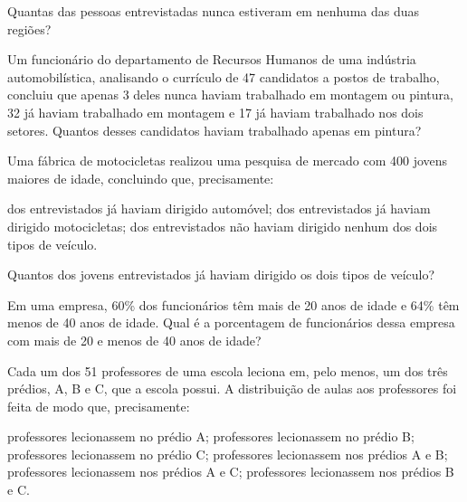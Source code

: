 \documentclass[10pt,a4paper]{article}
\begin{document}
\begin{multicols}{2}
\begin{question}[type=exam]
      Quantas das pessoas entrevistadas nunca estiveram em nenhuma das duas regiões?
    \end{question}

    \begin{question}[type=exam]
      Um funcionário do departamento de Recursos Humanos de uma indústria automobilística, analisando o currículo de 47 candidatos
      a postos de trabalho, concluiu que apenas 3 deles nunca haviam trabalhado em montagem ou pintura, 32 já haviam trabalhado em 
      montagem e 17 já haviam trabalhado nos dois setores. Quantos desses candidatos haviam trabalhado apenas em pintura?
    \end{question}

    \begin{question}[type=exam]
      Uma fábrica de motocicletas realizou uma pesquisa de mercado com 400 jovens maiores de idade, concluindo
      que, precisamente:
      \begin{tasks}
         dos entrevistados já haviam dirigido automóvel;
         dos entrevistados já haviam dirigido motocicletas;
         dos entrevistados não haviam dirigido nenhum dos dois tipos de veículo. 
      \end{tasks}

      Quantos dos jovens entrevistados já haviam dirigido os dois tipos de veículo?
    \end{question}

    \begin{question}[type=exam]
      Em uma empresa, 60\% dos funcionários têm mais de 20 anos de idade e 64\% têm menos de 40 anos de idade. 
      Qual é a porcentagem de funcionários dessa empresa com mais de 20 e menos de 40 anos de idade?
    \end{question}

    \begin{question}[type=exam]
      Cada um dos 51 professores de uma escola leciona em, pelo menos, um dos três prédios, A, B e C, que a escola possui. 
      A distribuição de aulas aos professores foi feita de modo que, precisamente:
      \begin{tasks}
         professores lecionassem no prédio A;
         professores lecionassem no prédio B;
         professores lecionassem no prédio C;
         professores lecionassem nos prédios A e B;
         professores lecionassem nos prédios A e C;
         professores lecionassem nos prédios B e C. 
      \end{tasks}


\end{question}
\end{multicols}
\end{document}
